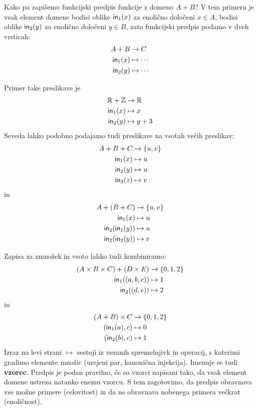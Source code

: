 Kako pa zapišemo funkcijski predpis funkcije z domeno $A + B$? V tem primeru je vsak element domene bodisi oblike
$\mathsf{in}_1(x)$ za enolično določeni $x \in A$, bodisi oblike $\mathsf{in}_2(y)$ za enolično določeni $y \in B$, zato funkcijski predpis podamo v dveh vrsticah:
%
\begin{align*}
    A + B &\to C \\
    \mathsf{in}_1(x) &\mapsto \cdots \\
    \mathsf{in}_2(y) &\mapsto \cdots
\end{align*}

\begin{primer}
  Primer take preslikave je
  \begin{align*}
    \mathbb{R} + \mathbb{Z} &\to \mathbb{R} \\
    \mathsf{in}_1(x) &\mapsto x \\
    \mathsf{in}_2(y) &\mapsto y + 3
  \end{align*}
  Seveda lahko podobno podajamo tudi preslikave na vsotah večih preslikav:
  \begin{align*}
    A + B + C &\to \{u, v\} \\
    \mathsf{in}_1(x) &\mapsto u \\
    \mathsf{in}_2(y) &\mapsto u \\
    \mathsf{in}_3(z) &\mapsto v
  \end{align*}
  in
  \begin{align*}
    A + (B + C) &\to \{u, v\} \\
    \mathsf{in}_1(x) &\mapsto u \\
    \mathsf{in}_2(\mathsf{in}_1(y)) &\mapsto u \\
    \mathsf{in}_2(\mathsf{in}_2(y)) &\mapsto v
  \end{align*}
\end{primer}

Zapisa za zmnožek in vsoto lahko tudi kombiniramo:
%
\begin{align*}
  (A \times B \times C) + (D \times E) &\to \{0, 1, 2\} \\
  \mathsf{in}_1((a, b, c)) &\mapsto 1 \\
  \mathsf{in}_2((d, e)) &\mapsto 2
\end{align*}
%
in
\begin{align*}
  (A + B) \times C &\to \{0, 1, 2\} \\
  (\mathsf{in}_1(a), c) &\mapsto 0 \\
  (\mathsf{in}_2(b), c) &\mapsto 1
\end{align*}
%
Izraz na levi strani $\mapsto$ sestoji iz vezanih spremelnjivk in operacij, s katerimi gradimo elemente množic (urejeni par, kanonična injekcija). Imenuje se tudi \textbf{vzorec}. Predpis je podan pravilno, če so vzorci napisani tako, da vsak element domene ustreza natanko enemu vzorcu.
%
S tem zagotovimo, da predpis obravnava vse možne primere (celovitost) in da ne obravnava nobenega primera večkrat (enoličnost).


